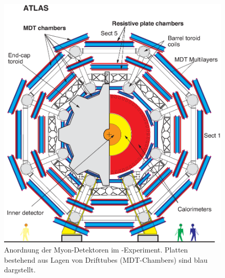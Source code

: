 \begin{figure}
\centering
\includegraphics[scale=0.4]{input/Fig1a.eps}\caption{Anordnung der Myon-Detektoren im \atlas-Experiment. Platten bestehend aus Lagen von Drifttubes (MDT-Chambers) sind blau dargstellt\cite{2010EPJC...70..875A}.}\label{fig:muon}
\end{figure}



